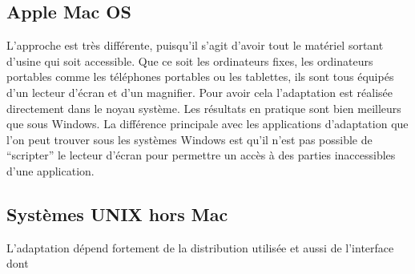 \documentclass[french,a4paper]{report}
\begin{document}
\subsection{Apple Mac OS}
L'approche est très différente, puisqu'il s'agit d'avoir tout le matériel sortant d'usine qui soit
accessible. Que ce soit les ordinateurs fixes, les ordinateurs portables comme les téléphones
portables ou les tablettes, ils sont tous équipés d'un lecteur d'écran et d'un magnifier. Pour
avoir cela l'adaptation est réalisée directement dans le noyau système. Les résultats en
pratique sont bien meilleurs que sous Windows. La différence principale avec les applications
d'adaptation que l'on peut trouver sous les systèmes Windows est qu'il n'est pas possible de
\enquote{scripter} le lecteur d'écran pour permettre un accès à des parties inaccessibles
d'une application.
\subsection{Systèmes UNIX hors Mac}
L'adaptation dépend fortement de la distribution utilisée et aussi de l'interface dont
\end{document}
